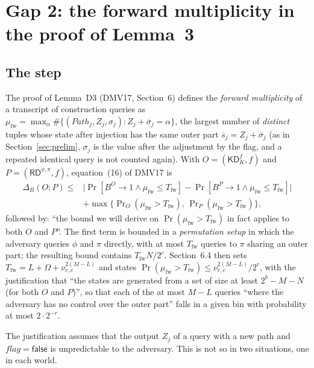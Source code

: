 \documentclass[11pt,a4paper]{article}
\theoremstyle{definition}
\theoremstyle{remark}
\newcommand{\KD}{\mathsf{KD}}
\newcommand{\RD}{\mathsf{RD}}
\newcommand{\Path}{\mathit{Path}}
\newcommand{\flag}{\mathit{flag}}
\newcommand{\false}{\mathsf{false}}
\newcommand{\outp}[1]{\overline{#1}}
\newcommand{\mufw}{\mu_{\mathrm{fw}}}
\newcommand{\Tfw}{T_{\mathrm{fw}}}
\begin{document}
\section{Gap 2: the forward multiplicity in the proof of Lemma~3}\label{sec:gap2}

\subsection{The step}
The proof of Lemma~D3 (DMV17, Section~6) defines the \emph{forward multiplicity} of a transcript of construction
queries as $\mufw = \max_\alpha \#\{ (\Path_j, Z_j, \sigma_j) : Z_j + \outp{\sigma}_j = \alpha \}$, the largest number of \emph{distinct}
tuples whose state after injection has the same outer part $\outp{s}_j = Z_j + \outp{\sigma}_j$ (as in Section~\ref{sec:prelim}, $\sigma_j$ is
the value after the adjustment by the flag, and a repeated identical query is not counted again). With $O = (\KD^f_K, f)$ and $P = (\RD^{\phi,\pi}, f)$, equation~(16) of DMV17 is
\begin{equation}\label{eq:16}
\begin{split}
\Delta_B(O ; P) \le{}& \bigl|\Pr[B^O \to 1 \wedge \mufw \le \Tfw] - \Pr[B^P \to 1 \wedge \mufw \le \Tfw]\bigr| \\
 &+ \max\bigl\{\Pr\nolimits_O(\mufw > \Tfw),\, \Pr\nolimits_P(\mufw > \Tfw)\bigr\},
\end{split}
\end{equation}
followed by: ``the bound we will derive on $\Pr(\mufw > \Tfw)$ in fact applies to both $O$ and $P$''. The first term
is bounded in a \emph{permutation setup} in which the adversary queries $\phi$ and $\pi$ directly, with at most $\Tfw$
queries to $\pi$ sharing an outer part; the resulting bound contains $\Tfw N/2^c$. Section~6.4 then sets
$\Tfw = L + \Omega + \nu^{2(M-L)}_{r,c}$ and states $\Pr(\mufw > \Tfw) \le \nu^{2(M-L)}_{r,c}/2^c$, with the justification that
``the states are generated from a set of size at least $2^b - M - N$ (for both $O$ and $P$)'', so that each of the at
most $M - L$ queries ``where the adversary has no control over the outer part'' falls in a given bin with probability
at most $2 \cdot 2^{-r}$.

The justification assumes that the output $Z_j$ of a query with a new path and $\flag = \false$ is unpredictable to
the adversary. This is not so in two situations, one in each world.
\end{document}
